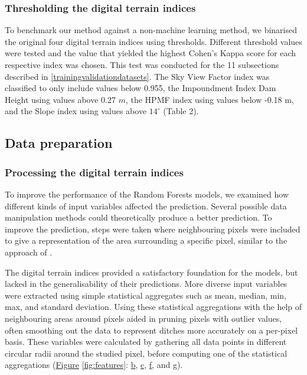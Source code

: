 \documentclass[]{interact}
\theoremstyle{plain}%
\theoremstyle{definition}
\theoremstyle{remark}
\begin{document}
\subsubsection{Thresholding the digital terrain indices}
To benchmark our method against a non-machine learning method, we binarised the original four digital terrain indices using thresholds. Different threshold values were tested and the value that yielded the highest Cohen's Kappa score for each respective index was chosen. This test was conducted for the 11 subsections described in \ref{trainingvalidationdatasets}. The Sky View Factor index was classified to only include values below 0.955, the Impoundment Index Dam Height using values above 0.27 $m$, the HPMF index using values below -0.18 m, and the Slope index using values above $14 ^{\circ}$ (Table 2). 

\subsection{Data preparation}

\subsubsection{Processing the digital terrain indices}
To improve the performance of the Random Forests models, we examined how different kinds of input variables affected the prediction. Several possible data manipulation methods could theoretically produce a better prediction. To improve the prediction, steps were taken where neighbouring pixels were included to give a representation of the area surrounding a specific pixel, similar to the approach of \citet{roelens}. 

The digital terrain indices provided a satisfactory foundation for the models, but lacked in the generalisability of their predictions. More diverse input variables were extracted using simple statistical aggregates such as mean, median, min, max, and standard deviation. Using these statistical aggregations with the help of neighbouring areas around pixels aided in pruning pixels with outlier values, often smoothing out the data to represent ditches more accurately on a per-pixel basis. These variables were calculated by gathering all data points in different circular radii around the studied pixel, before computing one of the statistical aggregations (\hyperref[fig:features]{Figure} \ref{fig:features}: \hyperref[fig:features]{b}, \hyperref[fig:features]{c}, \hyperref[fig:features]{f}, and \hyperref[fig:features]{g}).
\end{document}
